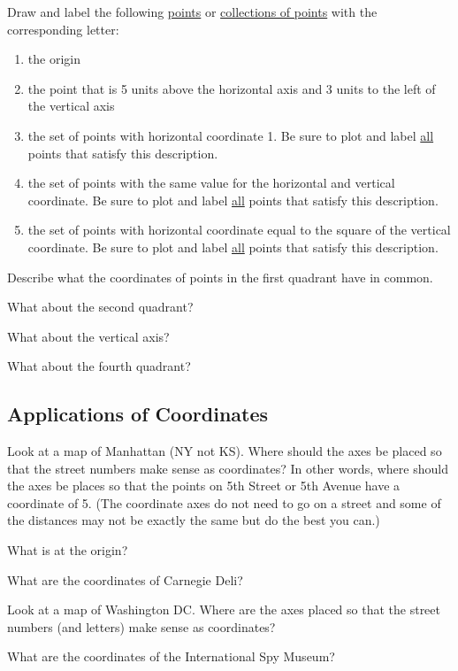 Draw and label the following \underline{points} or \underline{collections of points} with the corresponding letter:
\begin{enumerate}
\item the origin
\item the point that is 5 units above the horizontal axis and 3 units to the left of the vertical axis
\item the set of points with horizontal coordinate 1. Be sure to plot and label \underline{all} points that satisfy this description.
\item the set of points with the same value for the horizontal and vertical coordinate. Be sure to plot and label \underline{all} points that satisfy this description.
\item the set of points with horizontal coordinate equal to the square of the vertical coordinate. Be sure to plot and label \underline{all} points that satisfy this description.
\end{enumerate}
\eq

\bq \be
\item Describe what the coordinates of points in the first quadrant have in common.
\item What about the second quadrant?
\item What about the vertical axis?
\item What about the fourth quadrant?
\ee \eq

\subsection{Applications of Coordinates}

\bq \be
\item Look at a map of Manhattan (NY not KS). Where should the axes be placed so that the street numbers make sense as coordinates? In other words, where should the axes be places so that the points on 5th Street or 5th Avenue have a coordinate of 5. (The coordinate axes do not need to go on a street and some of the distances may not be exactly the same but do the best you can.)
\item What is at the origin?
\item What are the coordinates of Carnegie Deli?
\ee \eq

\bq\label{cq} \be
\item  Look at a map of Washington DC. Where are the axes placed so that the street numbers (and letters) make sense as coordinates?
\item What are the coordinates of the International Spy Museum?
\ee \eq


